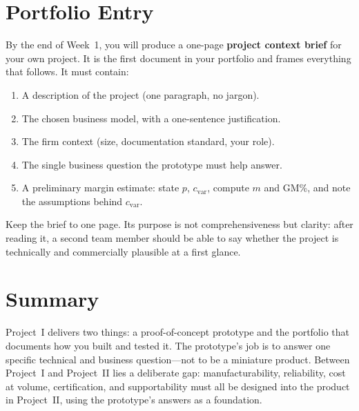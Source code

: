 \section*{Portfolio Entry}
\label{sec:ch1-artifact}

By the end of Week~1, you will produce a one-page \textbf{project context
brief} for your own project.
It is the first document in your portfolio and frames everything that
follows.
It must contain:

\begin{enumerate}
  \item A description of the project (one paragraph, no jargon).
  \item The chosen business model, with a one-sentence justification.
  \item The firm context (size, documentation standard, your role).
  \item The single business question the prototype must help answer.
  \item A preliminary margin estimate: state $p$, $c_{\text{var}}$,
        compute $m$ and GM\%, and note the assumptions behind
        $c_{\text{var}}$.
\end{enumerate}

Keep the brief to one page.
Its purpose is not comprehensiveness but clarity: after reading it, a
second team member should be able to say whether the project is
technically and commercially plausible at a first glance.

\section*{Summary}
\label{sec:ch1-summary}

Project~I delivers two things: a proof-of-concept prototype and the
portfolio that documents how you built and tested it.
The prototype's job is to answer one specific technical and business
question---not to be a miniature product.
Between Project~I and Project~II lies a deliberate gap: manufacturability,
reliability, cost at volume, certification, and supportability must all
be designed into the product in Project~II, using the prototype's answers
as a foundation.

